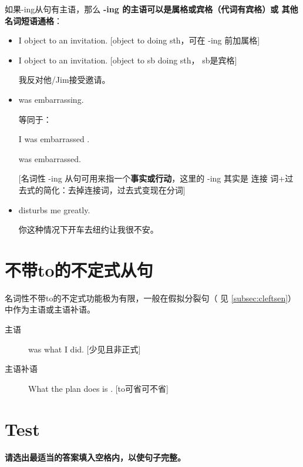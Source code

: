 如果-ing从句有主语，那么 \textbf{-ing 的主语可以是属格或宾格（代词有宾格）或
  其他名词短语通格}：
\begin{itemize}
\item I object to  an invitation. [object to doing
  sth，可在 -ing 前加属格]
\item I object to  an invitation. [object to sb
  doing sth， sb是宾格]

  我反对他/Jim接受邀请。

\item {} was embarrassing.


  等同于：

  I was embarrassed .

   was embarrassed.

  [名词性 -ing 从句可用来指一个\textbf{事实或行动}，这里的 -ing 其实是 连接
  词+过去式的简化：去掉连接词，过去式变现在分词]

\item {} disturbs me greatly.

  你这种情况下开车去纽约让我很不安。

\end{itemize}

\section{不带to的不定式从句}

名词性不带to的不定式功能极为有限，一般在假拟分裂句（
见 \cref{subsec:cleftsen}）中作为主语或主语补语。
\begin{description}
\item[主语]  was what I did. [少见且非正式]
\item[主语补语] What the plan does is .
  [to可省可不省]
\end{description}

\section{Test}

\paragraph{请选出最适当的答案填入空格内，以使句子完整。}

